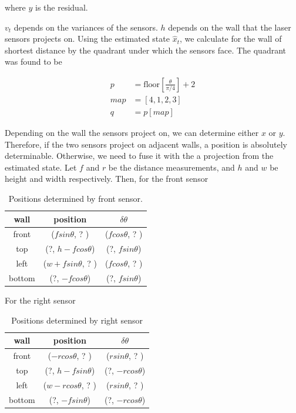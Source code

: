 \documentclass[11pt]{article}
\begin{document}
where $y$ is the residual.

$v_t$ depends on the variances of the sensors. $h$ depends on the wall that the laser sensors projects on. Using the estimated state $\hat{x}_t$, we calculate for the wall of shortest distance by the quadrant under which the sensors face. The quadrant was found to be

\begin{equation}
\begin{split}
p & =\mathrm{floor}\left[\frac{\theta}{\pi / 4}\right] + 2 \\
map & = [4, 1, 2, 3] \\
q & = p[map]
\end{split}
\end{equation}  

Depending on the wall the sensors project on, we can determine either $x$ or $y$. Therefore, if the two sensors project on adjacent walls, a position is absolutely determinable. Otherwise, we need to fuse it with the a projection from the estimated state. Let $f$ and $r$ be the distance measurements, and $h$ and $w$ be height and width respectively. Then, for the front sensor

 \begin{table}[H]
 	\centering
	\begin{tabular}{|c|c|c|}
		\hline
		wall & position & $\delta\theta$ \\
		\hline\hline
		front & ($f sin\theta$, ? ) & ($f cos\theta$, ? ) \\ \hline
		top & (?, $h - f cos\theta$) & (?, $f sin\theta$) \\ \hline
		left & ($w + f sin\theta$, ? ) & ($f cos\theta$, ? ) \\ \hline
		bottom & (?, $-f cos\theta$) & (?, $f sin\theta$) \\ \hline
	\end{tabular}
	\caption{Positions determined by front sensor.}\label{table:fpos}
\end{table}
\newpage
For the right sensor

 \begin{table}[H]
 	\centering
	\begin{tabular}{|c|c|c|}
		\hline
		wall & position & $\delta\theta$ \\
		\hline\hline
		front & ($-rcos\theta$, ? ) & ($r sin\theta$, ? ) \\ \hline
		top & (?, $h - f sin\theta$) & (?, $-r cos\theta$) \\ \hline
		left & ($w -r cos\theta$, ? ) & ($r sin\theta$, ? ) \\ \hline
		bottom & (?, $-f sin\theta$) & (?, $-r cos\theta$) \\ \hline
	\end{tabular}
	\caption{Positions determined by right sensor}\label{table:rpos}
\end{table}
\end{document}
